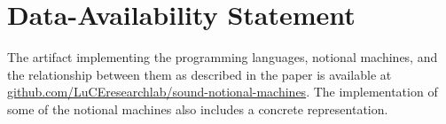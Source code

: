 \section*{Data-Availability Statement}
The artifact implementing
the programming languages, notional machines, and the relationship between them as described in the paper
is available at
\href{https://github.com/LuCEresearchlab/sound-notional-machines}{github.com/LuCEresearchlab/sound-notional-machines}.
The implementation of some of the notional machines also includes a concrete representation.

